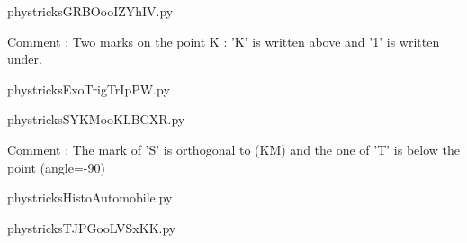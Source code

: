     \newcommand{\CaptionFigGRBOooIZYhIV}{<+Type your caption here+>}
    \begin{center}
        
    \end{center}
    phystricksGRBOooIZYhIV.py

    Comment : Two marks on the point K : 'K' is written above and '1' is written under.

    \clearpage
    


    \newcommand{\CaptionFigExoTrigTrIpPW}{<+Type your caption here+>}
    \begin{center}
        
    \end{center}
    phystricksExoTrigTrIpPW.py

    

    \clearpage
    


    \newcommand{\CaptionFigSYKMooKLBCXR}{<+Type your caption here+>}
    \begin{center}
        
    \end{center}
    phystricksSYKMooKLBCXR.py

    Comment : The mark of 'S' is orthogonal to (KM) and the one of 'T' is below the point (angle=-90)

    \clearpage
    


    \newcommand{\CaptionFigHistoAutomobile}{<+Type your caption here+>}
    \begin{center}
        
    \end{center}
    phystricksHistoAutomobile.py

    

    \clearpage
    


    \newcommand{\CaptionFigTJPGooLVSxKK}{<+Type your caption here+>}
    \begin{center}
        
    \end{center}
    phystricksTJPGooLVSxKK.py

    

    \clearpage
    


